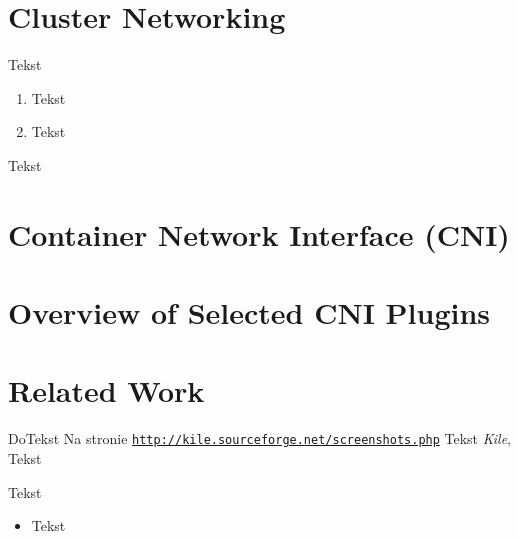 \section{Cluster Networking}
\label{sec:k8s_networking}

Tekst
\begin{enumerate}%
\item Tekst

\item Tekst
\end{enumerate}
Tekst


\section{Container Network Interface (CNI)}
\label{sec:cni_intro}





\section{Overview of Selected CNI Plugins}
\label{sec:cni_overview}

\section{Related Work}
\label{sec:realted_work}


DoTekst
Na stronie \underline{\texttt{http://kile.sourceforge.net/screenshots.php}} Tekst {\em Kile}, Tekst

Tekst

\begin{itemize}
\item Tekst
\end{itemize}
